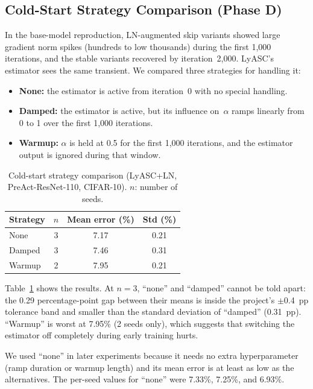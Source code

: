 \documentclass[conference,10pt]{IEEEtran}
\begin{document}
\subsection{Cold-Start Strategy Comparison (Phase D)}
\label{sec:phased}

In the base-model reproduction, LN-augmented skip variants showed large
gradient norm spikes (hundreds to low thousands) during the first 1,000
iterations, and the stable variants recovered by iteration~2,000.
LyASC's estimator sees the same transient. We compared three strategies
for handling it:

\begin{itemize}
    \item \textbf{None:} the estimator is active from iteration~0 with
    no special handling.
    \item \textbf{Damped:} the estimator is active, but its influence
    on~$\alpha$ ramps linearly from 0 to 1 over the first 1,000
    iterations.
    \item \textbf{Warmup:} $\alpha$ is held at 0.5 for the first 1,000
    iterations, and the estimator output is ignored during that window.
\end{itemize}

\begin{table}[t]
\centering
\caption{Cold-start strategy comparison (LyASC+LN,
PreAct-ResNet-110, CIFAR-10). $n$: number of seeds.}
\label{tab:coldstart}
\begin{tabular}{lccc}
\toprule
Strategy & $n$ & Mean error (\%) & Std (\%) \\
\midrule
None     & 3 & 7.17 & 0.21 \\
Damped   & 3 & 7.46 & 0.31 \\
Warmup   & 2 & 7.95 & 0.21 \\
\bottomrule
\end{tabular}
\end{table}

Table~\ref{tab:coldstart} shows the results. At $n = 3$, ``none'' and
``damped'' cannot be told apart: the 0.29 percentage-point gap between
their means is inside the project's $\pm$0.4~pp tolerance band and
smaller than the standard deviation of ``damped'' (0.31~pp). ``Warmup''
is worst at 7.95\% (2 seeds only), which suggests that switching the
estimator off completely during early training hurts.

We used ``none'' in later experiments because it needs no extra
hyperparameter (ramp duration or warmup length) and its mean error is at
least as low as the alternatives. The per-seed values for ``none'' were
7.33\%, 7.25\%, and 6.93\%.
\end{document}
